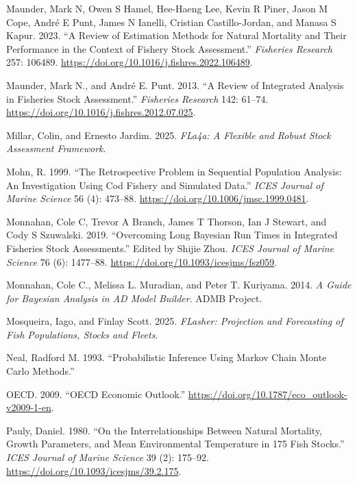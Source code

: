 \documentclass[
]{book}
\newlength{\cslhangindent}
\newlength{\cslentryspacingunit} %
\newenvironment{CSLReferences}[2] %
 {%
  \setlength{\parindent}{0pt}
  \ifodd #1
  \let\oldpar\par
  \def\par{\hangindent=\cslhangindent\oldpar}
  \fi
  \setlength{\parskip}{#2\cslentryspacingunit}
 }%
 {}
\begin{document}
\begin{CSLReferences}{1}{0}
\leavevmode{}%
Maunder, Mark N, Owen S Hamel, Hee-Haeng Lee, Kevin R Piner, Jason M Cope, André E Punt, James N Ianelli, Cristian Castillo-Jordan, and Manasa S Kapur. 2023. {``A Review of Estimation Methods for Natural Mortality and Their Performance in the Context of Fishery Stock Assessment.''} \emph{Fisheries Research} 257: 106489. \url{https://doi.org/10.1016/j.fishres.2022.106489}.

\leavevmode{}%
Maunder, Mark N., and André E. Punt. 2013. {``A Review of Integrated Analysis in Fisheries Stock Assessment.''} \emph{Fisheries Research} 142: 61--74. \url{https://doi.org/10.1016/j.fishres.2012.07.025}.

\leavevmode{}%
Millar, Colin, and Ernesto Jardim. 2025. \emph{FLa4a: A Flexible and Robust Stock Assessment Framework}.

\leavevmode{}%
Mohn, R. 1999. {``The Retrospective Problem in Sequential Population Analysis: An Investigation Using Cod Fishery and Simulated Data.''} \emph{ICES Journal of Marine Science} 56 (4): 473--88. \url{https://doi.org/10.1006/jmsc.1999.0481}.

\leavevmode{}%
Monnahan, Cole C, Trevor A Branch, James T Thorson, Ian J Stewart, and Cody S Szuwalski. 2019. {``Overcoming Long {Bayesian} Run Times in Integrated Fisheries Stock Assessments.''} Edited by Shijie Zhou. \emph{ICES Journal of Marine Science} 76 (6): 1477--88. \url{https://doi.org/10.1093/icesjms/fsz059}.

\leavevmode{}%
Monnahan, Cole C., Melissa L. Muradian, and Peter T. Kuriyama. 2014. \emph{A Guide for Bayesian Analysis in AD Model Builder}. ADMB Project.

\leavevmode{}%
Mosqueira, Iago, and Finlay Scott. 2025. \emph{FLasher: Projection and Forecasting of Fish Populations, Stocks and Fleets}.

\leavevmode{}%
Neal, Radford M. 1993. {``Probabilistic Inference Using Markov Chain Monte Carlo Methods.''}

\leavevmode{}%
OECD. 2009. {``OECD Economic Outlook.''} \url{https://doi.org/10.1787/eco_outlook-v2009-1-en}.

\leavevmode{}%
Pauly, Daniel. 1980. {``On the Interrelationships Between Natural Mortality, Growth Parameters, and Mean Environmental Temperature in 175 Fish Stocks.''} \emph{ICES Journal of Marine Science} 39 (2): 175--92. \url{https://doi.org/10.1093/icesjms/39.2.175}.


\end{CSLReferences}
\end{document}
